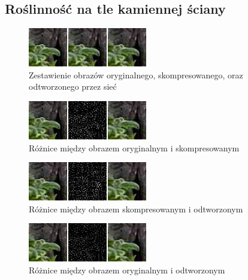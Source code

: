 \documentclass[a4paper,11pt]{article}
\begin{document}
\subsection{Roślinność na tle kamiennej ściany}
\begin{figure}[h!]
\begin{center}
	\includegraphics[width=0.85\columnwidth]{compare_sample.png}
	\caption{Zestawienie obrazów oryginalnego, skompresowanego, oraz odtworzonego przez sieć}
\end{center}
\end{figure}
\begin{figure}[h!]
\begin{center}
	\includegraphics[width=0.85\columnwidth]{orig_vs_comp.png}
	\caption{Różnice między obrazem oryginalnym i skompresowanym}
\end{center}
\end{figure}
\begin{figure}[h!]
\begin{center}
	\includegraphics[width=0.85\columnwidth]{comp_vs_rest.png}
	\caption{Różnice między obrazem skompresowanym i odtworzonym}
\end{center}
\end{figure}
\begin{figure}[h!]
\begin{center}
	\includegraphics[width=0.85\columnwidth]{orig_vs_rest.png}
	\caption{Różnice między obrazem oryginalnym i odtworzonym}
\end{center}
\end{figure}
\end{document}

